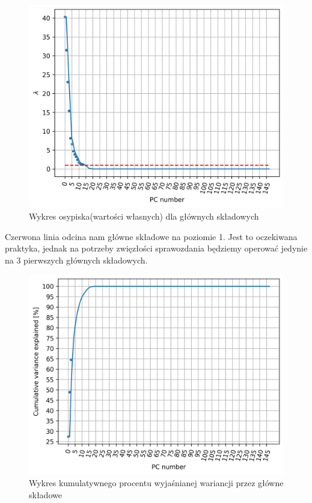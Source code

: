 \documentclass[12pt, a4paper]{article}
\begin{document}
        \begin{figure}[H]
            \centering
            \includegraphics{eigvals.png}
            \caption{Wykres osypiska(wartości własnych) dla głównych składowych}
        \end{figure}
    
        Czerwona linia odcina nam główne składowe na poziomie 1. Jest to oczekiwana praktyka, jednak na potrzeby zwięzłości sprawozdania
        będziemy operować jedynie na 3 pierwszych głównych składowych.

        \begin{figure}[H]
            \centering
            \includegraphics{cum_sum.png}
            \caption{Wykres kumulatywnego procentu wyjaśnianej wariancji przez główne składowe}
        \end{figure}
\end{document}
